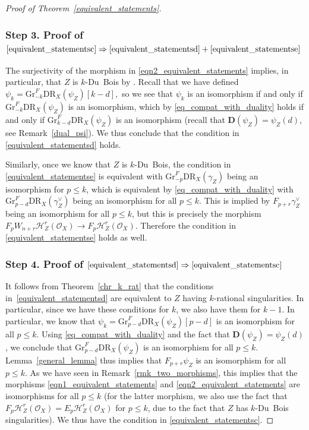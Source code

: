 \documentclass[JEP,XML,SOM,Unicode]{cedram}
\theoremstyle{plain}
\theoremstyle{definition}
\newcommand\cH{\mathcal{H}}
\newcommand\cO{\mathcal{O}}
\newcommand\cH{\mathcal{H}}
\newcommand\cO{\mathcal{O}}
\newcommand\gr{\mathrm{Gr}}
\newcommand\DR{\mathrm{DR}}
\begin{document}
\begin{proof}[Proof of Theorem~\ref{equivalent_statements}]
\subsubsection*{Step 3. Proof of $\eqref{equivalent_statementsc}\Rightarrow\eqref{equivalent_statementsd}+\eqref{equivalent_statementse}$}
The surjectivity of the morphism in
\eqref{eqn2_equivalent_statements} implies, in particular, that $Z$ is $k$-Du~Bois by \cite[Th.\,F]{MP1}.
Recall that we have defined $\psi_k=\gr^F_{-k}\DR_X(\psi_Z)[k-d],$ so we see that $\psi_k$ is an isomorphism if and only if
$\gr^F_{-k}\DR_X(\psi_Z)$ is an isomorphism, which by \eqref{eq_compat_with_duality} holds if
and only if $\gr^F_{k-d}\DR_X(\psi_Z)$ is an isomorphism (recall that ${\mathbf D}(\psi_Z)=\psi_Z(d)$, see Remark~\ref{dual_psi}).
We thus conclude that the condition in \eqref{equivalent_statementsd} holds.

Similarly, once we know that $Z$ is $k$-Du~Bois, the condition in \eqref{equivalent_statementse} is equivalent with $\gr^F_{-p}\DR_X(\gamma_Z)$ being
an isomorphism for $p\leq k$, which is equivalent by \eqref{eq_compat_with_duality} with $\gr^F_{p-d}\DR_X(\gamma_Z^{\vee})$
being an isomorphism for all $p\leq k$. This is implied by $F_{p+r}\gamma_Z^{\vee}$ being an isomorphism for all $p\leq k$, but this is precisely
the morphism $F_pW_{n+r}\cH^r_Z(\cO_X)\to F_p\cH^r_Z(\cO_X)$. Therefore the condition in \eqref{equivalent_statementse} holds as well.

\subsubsection*{Step 4. Proof of $\eqref{equivalent_statementsd}\Rightarrow\eqref{equivalent_statementsc}$}
It follows from Theorem~\ref{chr_k_rat} that the conditions in~\eqref{equivalent_statementsd} are equivalent to $Z$ having $k$-rational singularities. In particular,
since we have these conditions for $k$, we also have them for $k-1$. In particular, we know that
$\psi_k=\gr^F_{p-d}\DR_X(\psi_Z)[p-d]$ is an isomorphism for all $p\leq k$. Using \eqref{eq_compat_with_duality} and the fact that
${\mathbf D}(\psi_Z)=\psi_Z(d)$, we conclude that $\gr^F_{p-d}\DR_X(\psi_Z)$ is an isomorphism for all $p\leq k$.
Lemma~\ref{general_lemma} thus implies that $F_{p+r}\psi_Z$ is an isomorphism for all $p\leq k$. As we have seen in
Remark~\ref{rmk_two_morphisms}, this implies that the morphisms \eqref{eqn1_equivalent_statements} and \eqref{eqn2_equivalent_statements}
are isomorphisms for all $p\leq k$ (for the latter morphism, we also use the fact that $F_p\cH_Z^r(\cO_X)=E_p\cH^r_Z(\cO_X)$ for $p\leq k$,
due to the fact that $Z$ has $k$-Du~Bois singularities). We thus have the condition in \eqref{equivalent_statementsc}.


\end{proof}
\end{document}
